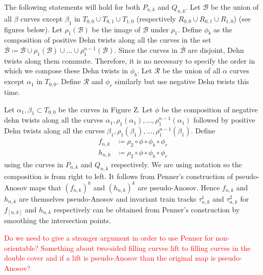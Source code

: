 The following statements will hold for both $P_{n,k}$ and $Q_{n,k}$. Let $\mathcal{B}$ be the union of all $\beta$ curves except $\beta_1$ in $T_{0,0} \cup T_{0,1} \cup T_{1,0}$ (respectively $R_{0,0} \cup R_{0,1} \cup R_{1,0}$) (see figures below). Let $\rho_1(\mathcal{B})$ be the image of $\mathcal{B}$ under $\rho_1$. Define $\phi_b$ as the composition of positive Dehn twists along all the curves in the set $\overline{\mathcal{B}} \coloneqq \mathcal{B} \cup \rho_1(\mathcal{B}) \cup \dots \cup \rho_1^{n-1}(\mathcal{B})$. Since the curves in $\overline{\mathcal{B}}$ are disjoint, Dehn twists along them commute. Therefore, it is no necessary to specify the order in which we compose these Dehn twists in $\phi_b$. Let $\mathcal{R}$ be the union of all $\alpha$ curves except $\alpha_1$ in $T_{0,0}$. Define $\mathcal{R}$ and $\phi_r$ similarly but use negative Dehn twists this time.

Let $\alpha_1,\beta_1 \subset T_{0,0}$ be the curves in Figure Z. Let $\phi$ be the composition of negative dehn twists along all the curves $\alpha_1, \rho_1(\alpha_1), \dots, \rho_1^{n-1}(\alpha_1)$ followed by positive Dehn twists along all the curves $\beta_1,\rho_1(\beta_1),\dots,\rho_1^{n-1}(\beta_1)$. Define
\begin{align*}
    f_{n,k} &\coloneqq \rho_2 \circ \phi \circ \phi_b \circ \phi_r \\
    h_{n,k} & \coloneqq \rho_2 \circ \phi \circ \phi_b \circ \phi_r
\end{align*}
using the curves in $P_{n,k}$ and $Q_{n,k}$ respectively. We are using notation so the composition is from right to left. It follows from Penner's construction of pseudo-Anosov maps that $(f_{n,k})^k$ and $(h_{n,k})^k$ are pseudo-Anosov. Hence $f_{n,k}$ and $h_{n,k}$ are themselves pseudo-Anosov and invariant train tracks $\tau^1_{n,k}$ and $\tau^2_{n,k}$ for $f_[n,k]$ and $h_{n,k}$ respectively can be obtained from Penner's construction by smoothing the intersection points.

\textcolor{red}{Do we need to give a stronger argument in order to use Penner for non-orientable? Something about two-sided filling curves lift to filling curves in the double cover and if a lift is pseudo-Anosov than the original map is pseudo-Anosov?}
